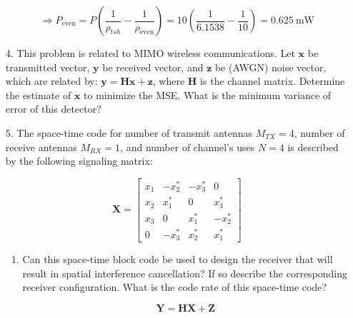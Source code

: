 \documentclass[fleqn]{article}
\makeatletter
\newenvironment{equationCenter}{\@fleqnfalse\begin{equation*}}{\end{equation*}}
\makeatother
\begin{document}
\begin{enumerate}
		\begin{equation*}
			\Rightarrow P_{\text{even}} = P\left(\frac{1}{\rho_{tsh}} - \frac{1}{\rho_{\text{even}}}\right) = 10\left(\frac{1}{6.1538} - \frac{1}{10}\right) = 0.625\ \text{mW}
		\end{equation*}		
		
		\item[4.] This problem is related to MIMO wireless communications. Let $\mathbf{x}$ be transmitted vector, $\mathbf{y}$ be received vector, and $\mathbf{z}$ be (AWGN) noise vector, which are related by: $\mathbf{y}=\mathbf{Hx} + \mathbf{z}$, where $\mathbf{H}$ is the channel matrix. Determine the estimate of $\mathbf{x}$ to minimize the MSE. What is the minimum variance of error of this detector?
		
		\item[5.] The space-time code for number of transmit antennas $M_{TX}=4$, number of receive antennas $M_{RX}=1$, and number of channel's uses $N=4$ is described by the following signaling matrix:
		
		\begin{equationCenter}
			\mathbf{X} = \begin{bmatrix}
				x_1 & -x_2^* & -x_3^* &  0 \\ 
				x_2 &  x_1^* &  0     &  x_3^* \\
				x_3 &  0     &  x_1^* & -x_2^* \\
				0   & -x_3^* &  x_2^* &  x_1^*
			\end{bmatrix}
		\end{equationCenter}
		
		\begin{enumerate}
			\item Can this space-time block code be used to design the receiver that will result in spatial interference cancellation? If so describe the corresponding receiver configuration. What is the code rate of this space-time code?
			
			\begin{equation*}
				\mathbf{Y} = \mathbf{H}\mathbf{X} + \mathbf{Z}
			\end{equation*}
			

\end{enumerate}
\end{enumerate}
\end{document}
